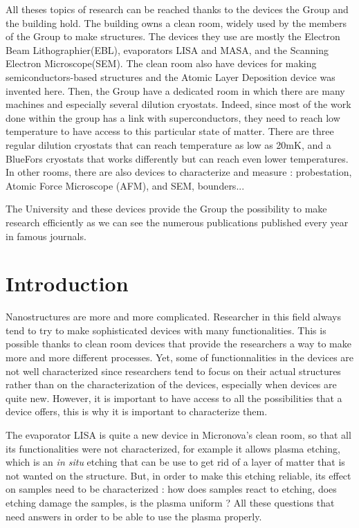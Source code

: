 All theses topics of research can be reached thanks to the devices the Group and the building hold. The building owns a clean room, widely used by the members of the Group to make structures. The devices they use are mostly the Electron Beam Lithographier(EBL), evaporators LISA and MASA, and the Scanning Electron Microscope(SEM). The clean room also have devices for making semiconductors-based structures and the Atomic Layer Deposition device was invented here. Then, the Group have a dedicated room in which there are many machines and especially several dilution cryostats. Indeed, since most of the work done within the group has a link with superconductors, they need to reach low temperature to have access to this particular state of matter\cite{NIS_thermo}. There are three regular dilution cryostats that can reach temperature as low as 20mK, and a BlueFors cryostats that works differently but can reach even lower temperatures. In other rooms, there are also devices to characterize and measure : probestation, Atomic Force Microscope (AFM), and SEM, bounders... 

The University and these devices provide the Group the possibility to make research efficiently as we can see the numerous publications published every year in famous journals.


\chapter*{Introduction}

Nanostructures are more and more complicated. Researcher in this field always tend to try to make sophisticated devices with many functionalities. This is possible thanks to clean room devices that provide the researchers a way to make more and more different processes. Yet, some of functionnalities in the devices are not well characterized since researchers tend to focus on their actual structures rather than on the characterization of the devices, especially when devices are quite new. However, it is important to have access to all the possibilities that a device offers, this is why it is important to characterize them. 

The evaporator LISA is quite a new device in Micronova's clean room, so that all its functionalities were not characterized, for example it allows plasma etching, which is an \textit{in situ} etching that can be use to get rid of a layer of matter that is not wanted on the structure. But, in order to make this etching reliable, its effect on samples need to be characterized : how does samples react to etching, does etching damage the samples, is the plasma uniform ? All these questions that need answers in order to be able to use the plasma properly.

